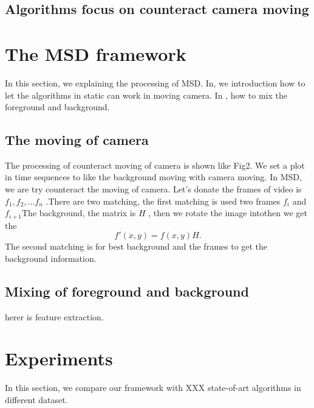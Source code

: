 \documentclass[journal]{IEEEtran}
\begin{document}
\subsection{Algorithms focus on counteract camera moving}
\section{The MSD framework}
\indent In this section, we explaining the processing of MSD. In, we introduction
how to let the algorithms in static can work in moving camera. In , how
to mix the foreground and background.
\subsection{The moving of camera}
\indent The processing of counteract moving of camera is shown like Fig2.
We set a plot in time sequences to like the background moving with camera
moving.
\indent In MSD, we are try counteract the moving of camera. Let's donate
the frames of video is ${f_1,f_2,...f_n}$ .There are two matching, the first
matching is used two frames $f_i$ and $f_{i+1}$The background, the matrix
 is $H$
, then we rotate the image intothen we get the 
\begin{displaymath}
    f'(x,y) = f(x,y)H.
\end{displaymath}
\indent The second matching is for best background and the frames to get
the background information.
\subsection{Mixing of foreground and background}
herer is feature extraction.

\section{Experiments}
In this section, we compare our framework with XXX state-of-art algorithms
in different dataset.
\end{document}
